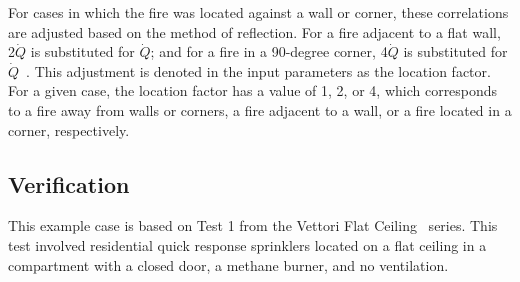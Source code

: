 For cases in which the fire was located against a wall or corner, these correlations are adjusted based on the method of reflection. For a fire adjacent to a flat wall, 2$\dot Q$ is substituted for $\dot Q$; and for a fire in a 90-degree corner, 4$\dot Q$ is substituted for $\dot Q$~\cite{SFPE:Alpert}. This adjustment is denoted in the input parameters as the location factor. For a given case, the location factor has a value of 1, 2, or 4, which corresponds to a fire away from walls or corners, a fire adjacent to a wall, or a fire located in a corner, respectively.


\clearpage


\subsection*{Verification}

This example case is based on Test 1 from the Vettori Flat Ceiling~\cite{Vettori:1} series. This test involved residential quick response sprinklers located on a flat ceiling in a compartment with a closed door, a methane burner, and no ventilation.

